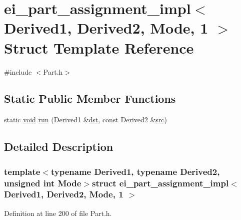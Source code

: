 \hypertarget{structei__part__assignment__impl_3_01_derived1_00_01_derived2_00_01_mode_00_011_01_4}{\section{ei\-\_\-part\-\_\-assignment\-\_\-impl$<$ Derived1, Derived2, Mode, 1 $>$ Struct Template Reference}
\label{structei__part__assignment__impl_3_01_derived1_00_01_derived2_00_01_mode_00_011_01_4}
}


{\ttfamily \#include $<$Part.\-h$>$}

\subsection*{Static Public Member Functions}
\begin{DoxyCompactItemize}
\item 
static \hyperlink{group___u_a_v_objects_plugin_ga444cf2ff3f0ecbe028adce838d373f5c}{void} \hyperlink{structei__part__assignment__impl_3_01_derived1_00_01_derived2_00_01_mode_00_011_01_4_ad5678a4d512df2f98fe70fe1e20e7b97}{run} (Derived1 \&\hyperlink{glext_8h_a92034251bfd455d524a9b5610cddba00}{dst}, const Derived2 \&\hyperlink{glext_8h_a72e0fdf0f845ded60b1fada9e9195cd7}{src})
\end{DoxyCompactItemize}


\subsection{Detailed Description}
\subsubsection*{template$<$typename Derived1, typename Derived2, unsigned int Mode$>$struct ei\-\_\-part\-\_\-assignment\-\_\-impl$<$ Derived1, Derived2, Mode, 1 $>$}



Definition at line 200 of file Part.\-h.



